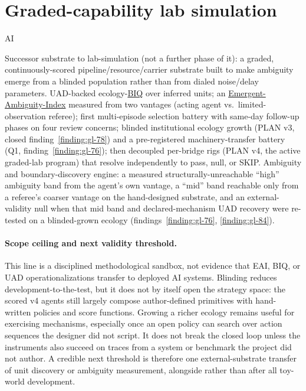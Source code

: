 \section{Graded-capability lab simulation}
\label{sec:appn-graded-lab-simulation}
\begin{authbar}{AI}

Successor substrate to lab-simulation (not a further phase of it): a graded, continuously-scored pipeline/resource/carrier substrate built to make ambiguity emerge from a blinded population rather than from dialed noise/delay parameters. UAD-backed ecology-\hyperref[gloss:biq-eai]{BIQ} over inferred units; an \hyperref[gloss:biq-eai]{Emergent-Ambiguity-Index} measured from two vantages (acting agent vs.\ limited-observation referee); first multi-episode selection battery with same-day follow-up phases on four review concerns; blinded institutional ecology growth (PLAN v3, closed finding~\ref{finding:gl-78}) and a pre-registered machinery-transfer battery (Q1, finding~\ref{finding:gl-76}); then decoupled per-bridge rigs (PLAN v4, the active graded-lab program) that resolve independently to pass, null, or SKIP. Ambiguity and boundary-discovery engine: a measured structurally-unreachable ``high'' ambiguity band from the agent's own vantage, a ``mid'' band reachable only from a referee's coarser vantage on the hand-designed substrate, and an external-validity null when that mid band and declared-mechanism UAD recovery were re-tested on a blinded-grown ecology (findings~\ref{finding:gl-76}, \ref{finding:gl-84}).

\paragraph{Scope ceiling and next validity threshold.}
This line is a disciplined methodological sandbox, not evidence that EAI, BIQ, or UAD operationalizations transfer to deployed AI systems. Blinding reduces development-to-the-test, but it does not by itself open the strategy space: the scored v4 agents still largely compose author-defined primitives with hand-written policies and score functions. Growing a richer ecology remains useful for exercising mechanisms, especially once an open policy can search over action sequences the designer did not script. It does not break the closed loop unless the instruments also succeed on traces from a system or benchmark the project did not author. A credible next threshold is therefore one external-substrate transfer of unit discovery or ambiguity measurement, alongside rather than after all toy-world development.

\small
\setlength{\tabcolsep}{3pt}
\renewcommand{\arraystretch}{1.2}
\end{authbar}
